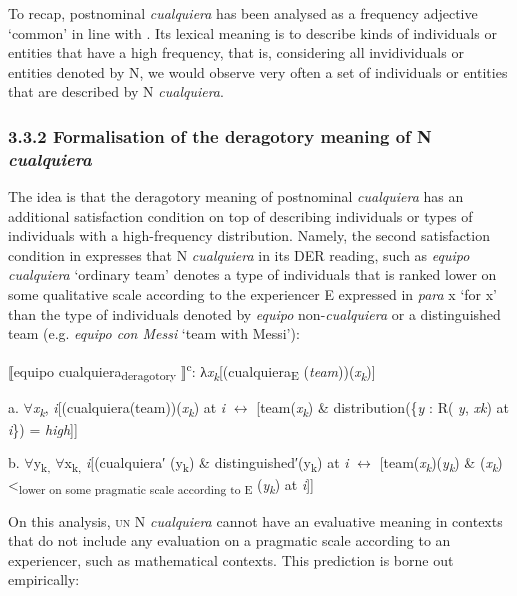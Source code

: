 \documentclass[output=paper]{langscibook}
\begin{document}
  To recap, postnominal \textit{cualquiera} has been analysed as a frequency adjective ‘common’ in line with \citet{GehrkeMcNally2015}. Its lexical meaning is to describe kinds of individuals or entities that have a high frequency, that is, considering all invidividuals or entities denoted by N, we would observe very often a set of individuals or entities that are described by N \textit{cualquiera}. 

\subsubsection{\textbf{3.3.2} \textbf{Formalisation} \textbf{of} \textbf{the} \textbf{deragotory} \textbf{meaning} \textbf{of} \textbf{N} \textbf{\textit{cualquiera}}}

The idea is that the deragotory meaning of postnominal \textit{cualquiera} has an additional satisfaction condition on top of describing individuals or types of individuals with a high-frequency distribution. Namely, the second satisfaction condition in  expresses that N \textit{cualquiera} in its DER reading, such as \textit{equipo cualquiera} ‘ordinary team’ denotes a type of individuals that is ranked lower on some qualitative scale according to the experiencer E expressed in \textit{para} x ‘for x’ than the type of individuals denoted by \textit{equipo} non-\textit{cualquiera} or a distinguished team (e.g. \textit{equipo con Messi} ‘team with Messi’):

\label{bkm:Ref58094203}  ⟦equipo cualquiera\textsubscript{deragotory} ⟧\textsuperscript{c}: λ\textit{x\textsubscript{k}}[(cualquiera\textsubscript{E} (\textit{team}))(\textit{x\textsubscript{k}})]

  a.  ${\forall}$\textit{x\textsubscript{k}}, \textit{i}[(cualquiera(team))(\textit{x\textsubscript{k}}) at \textit{i} $\leftrightarrow $ [team(\textit{x\textsubscript{k}}) \& distribution(\{\textit{y} : R( \textit{y}, \textit{xk}) at \textit{i}\}) = \textit{high}]]

  b.  ${\forall}$y\textsubscript{k,} ${\forall}$x\textsubscript{k,} \textit{i}[(cualquiera′ (y\textsubscript{k}) \& distinguished′(y\textsubscript{k}) at \textit{i} $\leftrightarrow $ [team(\textit{x\textsubscript{k}})(\textit{y\textsubscript{k}}) \& (\textit{x\textsubscript{k}}) <\textsubscript{lower on some pragmatic scale according to E} (\textit{y\textsubscript{k}}) at \textit{i}]]

On this analysis, \textsc{un} N \textit{cualquiera} cannot have an evaluative meaning in contexts that do not include any evaluation on a pragmatic scale according to an experiencer, such as mathematical contexts. This prediction is borne out empirically:
\end{document}
